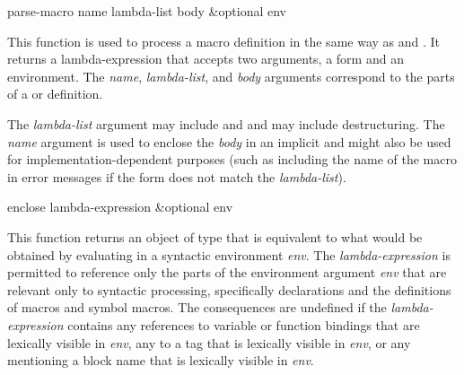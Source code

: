 \begin{defun}[Function]
parse-macro name lambda-list body &optional env

  This function is used to process a macro definition in the same way
  as  and .  It returns a lambda-expression that accepts
  two arguments, a form and an environment.  The \emph{name}, \emph{lambda-list},
  and \emph{body} arguments correspond to the parts of a  or 
  definition.

  The \emph{lambda-list} argument may include  and 
  and may include destructuring.
  The \emph{name}
  argument is used to enclose the \emph{body} in an implicit  and might also
  be used for implementation-dependent purposes (such as including the name of
  the macro in error messages if the form does not match the \emph{lambda-list}).
\end{defun}

\begin{defun}[Function]
enclose lambda-expression &optional env

  This function returns an object of type  that is equivalent to what
  would be obtained by evaluating 
  in a syntactic
  environment \emph{env}.  The \emph{lambda-expression} is permitted to reference only the
  parts of the environment argument \emph{env} that are relevant only to syntactic
  processing, specifically declarations and the definitions of macros and
  symbol macros.  The consequences are undefined if the \emph{lambda-expression}
  contains any references to variable or function bindings that are 
  lexically visible in \emph{env}, any  to a tag that is lexically visible in 
  \emph{env}, or any  mentioning a block name that is lexically 
  visible in \emph{env}.
\end{defun}

\fi